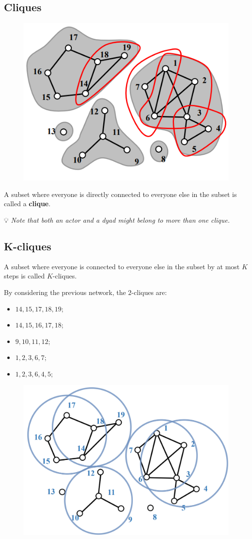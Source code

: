 \documentclass[
  notitlepage,
  onecolumn,
  openany]{book}
\providecommand{\tightlist}{%
  \setlength{\itemsep}{0pt}\setlength{\parskip}{0pt}}
\begin{document}
\hypertarget{cliques}{%
\subsection{Cliques}\label{cliques}}

\begin{figure}[h!]

{\centering \includegraphics[width=0.5\linewidth]{images/11-Subgroups and Structural Equivalence/Untitled 1} 

}

\end{figure}

A subset where everyone is directly connected to everyone else in the subset is called a \textbf{clique}.

💡 \emph{Note that both an actor and a dyad might belong to more than one clique.}

\hypertarget{k-cliques}{%
\subsection{K-cliques}\label{k-cliques}}

A subset where everyone is connected to everyone else in the subset by at most \(K\) steps is called \(K\)-cliques.

By considering the previous network, the \(2\)-cliques are:

\begin{itemize}
\tightlist
\item
  \(14, 15, 17, 18, 19\);
\item
  \(14, 15, 16, 17, 18\);
\item
  \(9, 10, 11, 12\);
\item
  \(1, 2, 3, 6, 7\);
\item
  \(1, 2, 3, 6, 4, 5\);
\end{itemize}

\begin{figure}[h!]

{\centering \includegraphics[width=0.5\linewidth]{images/11-Subgroups and Structural Equivalence/12-network} 

}

\end{figure}
\end{document}
